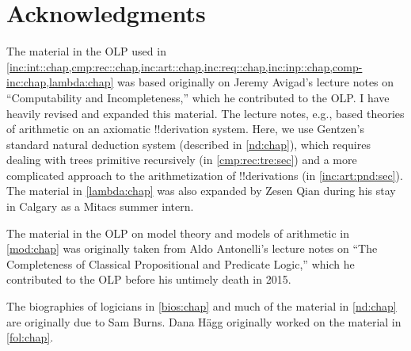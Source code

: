 \section*{Acknowledgments}

The material in the OLP used in
\cref{inc:int::chap,cmp:rec::chap,inc:art::chap,inc:req::chap,inc:inp::chap,comp-inc:chap,lambda:chap}
was based originally on Jeremy Avigad's lecture notes on
``Computability and Incompleteness,'' which he contributed to the OLP.
I have heavily revised and expanded this material. The lecture notes,
e.g., based theories of arithmetic on an axiomatic !!{derivation} system. Here,
we use Gentzen's standard natural deduction system (described in
\cref{nd:chap}), which requires dealing with trees primitive
recursively (in \cref{cmp:rec:tre:sec}) and a more complicated
approach to the arithmetization of !!{derivation}s (in
\cref{inc:art:pnd:sec}). The material in \cref{lambda:chap} was also
expanded by Zesen Qian during his stay in Calgary as a Mitacs summer
intern.

The material in the OLP on model theory and models of arithmetic in
\cref{mod:chap} was originally taken from Aldo Antonelli's lecture
notes on ``The Completeness of Classical Propositional and Predicate
Logic,'' which he contributed to the OLP before his untimely death in
2015.

The biographies of logicians in \cref{bios:chap} and much of the
material in \cref{nd:chap} are originally due to Sam Burns.
Dana H\"agg originally worked on the material in \cref{fol:chap}.
